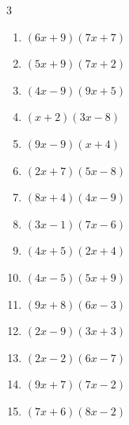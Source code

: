 \begin{multicols}{3}
\begin{enumerate}
\resetques

  \item $(6x+9)(7x+7)$


  \item $(5x+9)(7x+2)$


  \item $(4x-9)(9x+5)$


  \item $(x+2)(3x-8)$


  \item $(9x-9)(x+4)$


  \item $(2x+7)(5x-8)$


  \item $(8x+4)(4x-9)$


  \item $(3x-1)(7x-6)$


  \item $(4x+5)(2x+4)$


  \item $(4x-5)(5x+9)$


  \item $(9x+8)(6x-3)$


  \item $(2x-9)(3x+3)$


  \item $(2x-2)(6x-7)$


  \item $(9x+7)(7x-2)$


  \item $(7x+6)(8x-2)$


\end{enumerate}
\end{multicols}
